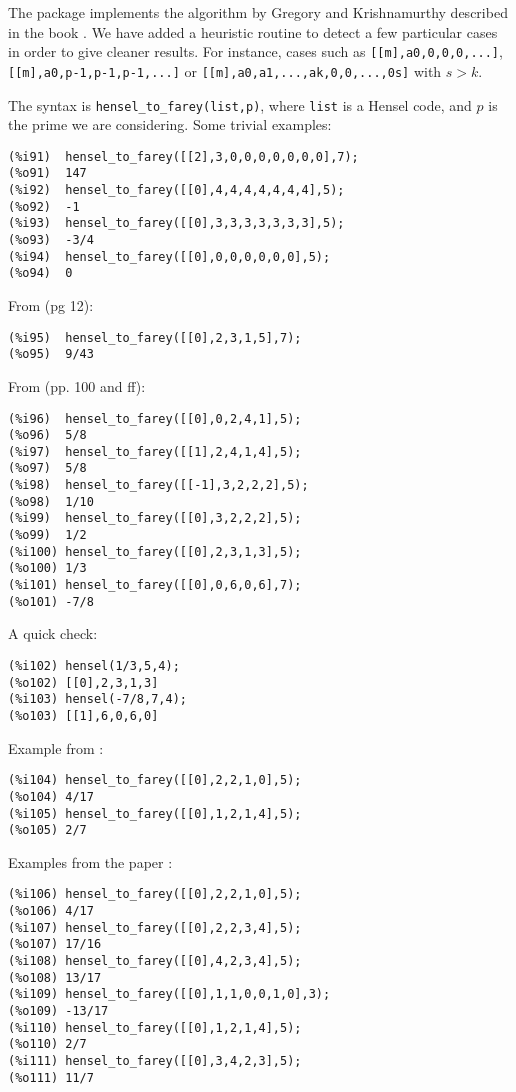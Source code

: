 \documentclass[fleqn]{cas-sc}
\begin{document}
The package implements the algorithm by Gregory and Krishnamurthy
described in the book \cite{7}. We have added a heuristic routine
to detect a few particular cases in order to give cleaner results.
For instance, cases such as 
\texttt{[[m],a0,0,0,0,...]},\texttt{[[m],a0,p-1,p-1,p-1,...]} or 
\texttt{[[m],a0,a1,...,ak,0,0,...,0s]}
with $s>k$.

The syntax is \texttt{hensel\_to\_farey(list,p)}, where \texttt{list} is
a Hensel code, and $p$ is the prime we are considering.
Some trivial examples:
\begin{verbatim}
(%i91)	hensel_to_farey([[2],3,0,0,0,0,0,0,0],7);
(%o91)	147
(%i92)	hensel_to_farey([[0],4,4,4,4,4,4,4],5);
(%o92)	-1
(%i93)	hensel_to_farey([[0],3,3,3,3,3,3,3],5);
(%o93)	-3/4
(%i94)	hensel_to_farey([[0],0,0,0,0,0,0],5);
(%o94)	0
\end{verbatim}

From \cite{6} (pg 12):
\begin{verbatim}
(%i95)	hensel_to_farey([[0],2,3,1,5],7);
(%o95)	9/43
\end{verbatim}

From \cite{7} (pp. 100 and ff):
\begin{verbatim}
(%i96)	hensel_to_farey([[0],0,2,4,1],5);
(%o96)	5/8
(%i97)	hensel_to_farey([[1],2,4,1,4],5);
(%o97)	5/8
(%i98)	hensel_to_farey([[-1],3,2,2,2],5);
(%o98)	1/10
(%i99)	hensel_to_farey([[0],3,2,2,2],5);
(%o99)	1/2
(%i100)	hensel_to_farey([[0],2,3,1,3],5);
(%o100)	1/3
(%i101)	hensel_to_farey([[0],0,6,0,6],7);
(%o101)	-7/8
\end{verbatim}

A quick check:
\begin{verbatim}
(%i102)	hensel(1/3,5,4);
(%o102)	[[0],2,3,1,3]
(%i103)	hensel(-7/8,7,4);
(%o103)	[[1],6,0,6,0]
\end{verbatim}

Example from \cite{11}:
\begin{verbatim}
(%i104)	hensel_to_farey([[0],2,2,1,0],5);
(%o104)	4/17
(%i105)	hensel_to_farey([[0],1,2,1,4],5);
(%o105)	2/7
\end{verbatim}

Examples from the paper \cite{8}:
\begin{verbatim}
(%i106)	hensel_to_farey([[0],2,2,1,0],5);
(%o106)	4/17
(%i107)	hensel_to_farey([[0],2,2,3,4],5);
(%o107)	17/16
(%i108)	hensel_to_farey([[0],4,2,3,4],5);
(%o108)	13/17
(%i109)	hensel_to_farey([[0],1,1,0,0,1,0],3);
(%o109)	-13/17
(%i110)	hensel_to_farey([[0],1,2,1,4],5);
(%o110)	2/7
(%i111)	hensel_to_farey([[0],3,4,2,3],5);
(%o111)	11/7
\end{verbatim}
\end{document}
